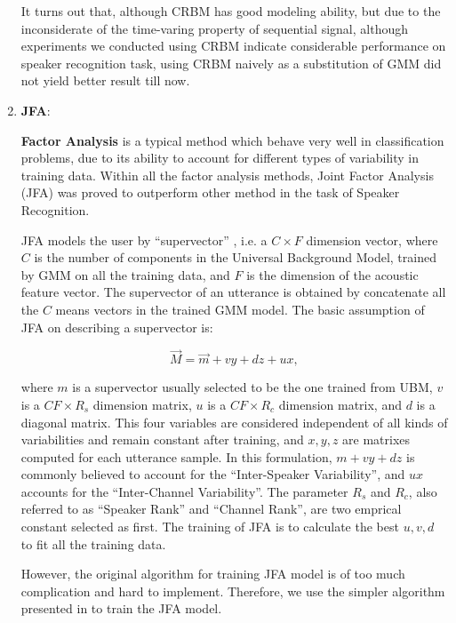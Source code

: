 \begin{enumerate}
			It turns out that, although CRBM has good modeling ability, but
			due to the inconsiderate of the time-varing property of sequential
			signal, although experiments we conducted using CRBM indicate
			considerable performance on speaker recognition task, using CRBM
			naively as a substitution of GMM did not yield better result till
			now.

		\item \textbf{JFA}:

          \textbf{Factor Analysis} is a typical method which behave
          very well in classification problems, due to its ability to
          account for different types of variability in training data.
          Within all the factor analysis methods,
          Joint Factor Analysis (JFA)\cite{jfa2,jfa-se} was proved to outperform other method
          in the task of Speaker Recognition.

          JFA models the user by ``supervector'' , i.e. a $C\times F $ dimension vector, where $C$ is
          the number of components in the Universal Background Model, trained by GMM on all the training data,
          and $ F$ is the dimension of the acoustic feature vector. The supervector of an utterance is obtained by concatenate
          all the $C $ means vectors in the trained GMM model. The basic assumption of JFA on describing a supervector is:

          \[ \vec{M} = \vec{ m } + vy + dz + ux, \]

          where $m$ is a supervector usually selected to be the one trained from UBM, $v$ is a $ CF \times R_s$ dimension matrix,
          $ u$ is a $ CF \times R_c$ dimension matrix, and $d$ is a diagonal matrix.
          This four variables are considered independent of all kinds of variabilities and remain constant after training, and
          $x, y, z $ are matrixes computed for each utterance sample.
          In this formulation, $ m + vy + dz$ is commonly believed to account for the ``Inter-Speaker Variability'', and $ux $ accounts
          for the ``Inter-Channel Variability''.
          The parameter $ R_s $ and $ R_c$, also referred to as ``Speaker Rank'' and ``Channel Rank'', are two emprical constant selected as first.
          The training of JFA is to calculate the best $ u, v, d$ to fit all the training data.

          However, the original algorithm \cite{jfa-se} for training JFA model is of
          too much complication and hard to implement.
          Therefore, we use the simpler algorithm presented in \cite{jfa-study}
          to train the JFA model.
	\end{enumerate}


